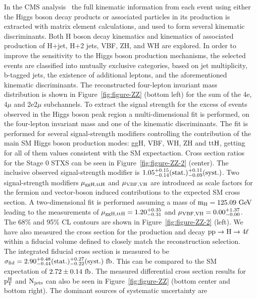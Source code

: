 \documentclass[10pt]{article}
\begin{document}
In the CMS analysis~\cite{Sirunyan:2017exp} the full kinematic information from each
event using either
the Higgs boson decay products or associated particles in its production is
extracted with matrix element calculations, and used to form several kinematic
discriminants. Both H boson decay kinematics and kinematics of associated
production of H+jet, H+2 jets, VBF, ZH, and WH are explored. In order to improve
the sensitivity to the Higgs boson production mechanisms, the selected events
are classified into mutually exclusive categories, based on jet multiplicity,
b-tagged jets, the existence of additional leptons, and the aforementioned
kinematic discriminants. The reconstructed four-lepton invariant mass distribution
is shown in Figure~\ref{fig:figure-ZZ} (bottom left) for the sum of the 4e,
4$\mu$ and 2e2$\mu$ subchannels. To extract the signal strength for the excess
of events observed in the Higgs boson peak region a multi-dimensional fit
is performed, on the four-lepton invariant mass and one of the kinematic
discriminants. The fit is performed for several signal-strength modifiers
controlling the contribution of the main SM Higgs boson production modes: ggH,
VBF, WH, ZH and ${\rm ttH}$, getting for all of them values consistent
with the SM expectaction. Cross section ratios for the Stage 0 STXS can be seen
in Figure~\ref{fig:figure-ZZ-2} (center). The inclusive observed signal-strength
modifier is ${\rm 1.05_{-0.14}^{+0.15}(stat.)_{-0.09}^{+0.11}(syst.)}$.
Two signal-strength modifiers ${\rm \mu_{ggH,ttH}}$ and ${\rm \mu_{VBF,VH}}$ are
introduced as scale factors for the fermion and vector-boson induced contributions
to the expected SM cross section. A two-dimensional fit is performed assuming a
mass of ${\rm m_H = 125.09~GeV}$ leading to the measurements of
${\rm \mu_{ggH,ttH} = 1.20_{-0.31}^{+0.35}}$ and
${\rm \mu_{VBF,VH} = 0.00_{-0.00}^{+1.37}}$. The 68\% and 95\% CL contours are
shown in Figure~\ref{fig:figure-ZZ-2} (left). We have also
measured the cross section for the production and decay ${\rm pp \to H \to 4\ell}$
within a fiducial volume defined to closely match the reconstruction selection.
The integrated fiducial cross section is measured to be
${\rm \sigma_{fid} = 2.90_{-0.44}^{+0.48}(stat.)_{-0.22}^{+0.27}(syst.)~fb}$.
This can be compared to the SM expectation of
${\rm 2.72 \pm 0.14~fb}$. The measured differential cross section results for
${\rm p_{T}^{H}}$ and ${\rm N_{jets}}$ can also be seen in Figure~\ref{fig:figure-ZZ}
(bottom center and bottom right). The dominant sources of systematic uncertainty are
\end{document}
